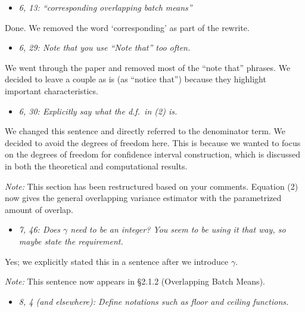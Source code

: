 \documentclass[11pt,notitlepage,onecolumn]{article}
\newcommand{\noi}{\noindent}
\begin{document}
\begin{itemize}
\item[] \textit{6, 13: ``corresponding overlapping batch means''}
\end{itemize}

\noi
Done.  
We removed the word `corresponding' as part of the rewrite.
\medskip 

\begin{itemize}
\item[] \textit{6, 29: Note that you use ``Note that'' too often.}
\end{itemize}

\noi
We went through the paper and removed most of the ``note that'' phrases. 
We decided to leave a couple as is (as ``notice that'') because they highlight important characteristics.  
\medskip 



\begin{itemize}
\item[] \textit{6, 30: Explicitly say what the d.f.\ in (2) is.}
\end{itemize}

\noi
We changed this sentence and directly referred to the denominator term.
We decided to avoid the degrees of freedom here. 
This is because we wanted to focus on the degrees of freedom for confidence interval construction, which is discussed in both the theoretical and computational results.
\medskip  

\noi 
{\it Note:} This section has been restructured based on your comments. 
Equation (2) now gives the general overlapping variance estimator with the parametrized amount of overlap. 
\medskip 



\begin{itemize}
\item[] \textit{7, 46: Does $\gamma$ need to be an integer? 
You seem to be using it that way, so maybe state the requirement.}
\end{itemize}

\noi
Yes; we explicitly stated this in a sentence after we introduce $\gamma$.
\medskip 

\noi 
{\it Note:} This sentence now appears in \S 2.1.2 (Overlapping Batch Means). 
\medskip 



\begin{itemize}
\item[] \textit{8, 4 (and elsewhere): Define notations such as floor and ceiling functions.}
\end{itemize}
\end{document}

